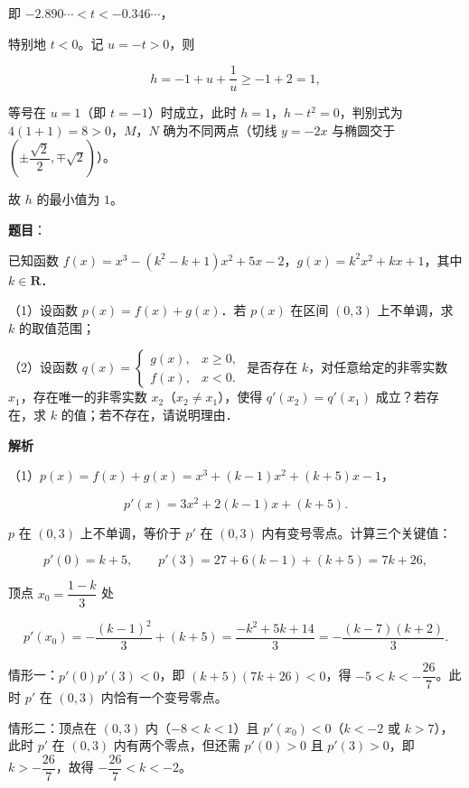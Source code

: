 \begin{answer}
即 $-2.890\cdots<t<-0.346\cdots$，

特别地 $t<0$。记 $u=-t>0$，则

\nopagebreak[4]
\[h=-1+u+\frac1u\geqslant-1+2=1,\]

等号在 $u=1$（即 $t=-1$）时成立，此时 $h=1$，$h-t^2=0$，判别式为 $4(1+1)=8>0$，$M$，$N$ 确为不同两点（切线 $y=-2x$ 与椭圆交于 $\left(\pm\dfrac{\sqrt2}{2},\mp\sqrt2\right)$）。

故 $h$ 的最小值为 $1$。


\end{answer}
\begin{answer}

\textbf{题目}：

已知函数 $f(x)=x^3-(k^2-k+1)x^2+5x-2$，$g(x)=k^2x^2+kx+1$，其中 $k\in\mathbf R$．

（1）设函数 $p(x)=f(x)+g(x)$．若 $p(x)$ 在区间 $(0,3)$ 上不单调，求 $k$ 的取值范围；

（2）设函数 $q(x)=\begin{cases}g(x),&x\geqslant0,\\f(x),&x<0.\end{cases}$ 是否存在 $k$，对任意给定的非零实数 $x_1$，存在唯一的非零实数 $x_2$（$x_2\neq x_1$），使得 $q'(x_2)=q'(x_1)$ 成立？若存在，求 $k$ 的值；若不存在，请说明理由．

\textbf{解析}

（1）$p(x)=f(x)+g(x)=x^3+(k-1)x^2+(k+5)x-1$，

\nopagebreak[4]
\[p'(x)=3x^2+2(k-1)x+(k+5).\]

$p$ 在 $(0,3)$ 上不单调，等价于 $p'$ 在 $(0,3)$ 内有变号零点。计算三个关键值：

\nopagebreak[4]
\[p'(0)=k+5,\qquad p'(3)=27+6(k-1)+(k+5)=7k+26,\]

顶点 $x_0=\dfrac{1-k}{3}$ 处

\nopagebreak[4]
\[p'(x_0)=-\frac{(k-1)^2}{3}+(k+5)=\frac{-k^2+5k+14}{3}=-\frac{(k-7)(k+2)}{3}.\]

情形一：$p'(0)p'(3)<0$，即 $(k+5)(7k+26)<0$，得 $-5<k<-\dfrac{26}{7}$。此时 $p'$ 在 $(0,3)$ 内恰有一个变号零点。

情形二：顶点在 $(0,3)$ 内（$-8<k<1$）且 $p'(x_0)<0$（$k<-2$ 或 $k>7$），此时 $p'$ 在 $(0,3)$ 内有两个零点，但还需 $p'(0)>0$ 且 $p'(3)>0$，即 $k>-\dfrac{26}{7}$，故得 $-\dfrac{26}{7}<k<-2$。


\end{answer}
